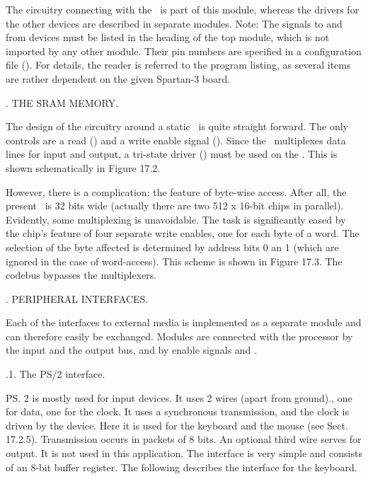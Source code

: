 {The circuitry connecting with the \SRAM\ is part of this module, whereas the drivers for the other devices are described in separate modules. Note: The signals to and from devices must be listed in the heading of the top module, which is not imported by any other module. Their pin numbers are specified in a configuration file (). For details, the reader is referred to the program listing, as several items are rather dependent on the given Spartan-3 board.

. THE SRAM MEMORY.

The design of the circuitry around a static \RAM\ is quite straight forward. The only controls are a read () and a write enable signal (). Since the \SRAM\ multiplexes data lines for input and output, a tri-state driver () must be used on the \FPGA. This is shown schematically in Figure 17.2.


However, there is a complication: the feature of byte-wise access. After all, the present \RAM\ is 32 bits wide (actually there are two 512 x 16-bit chips in parallel). Evidently, some multiplexing is unavoidable. The task is significantly eased by the chip's feature of four separate write enables, one for each byte of a word. The selection of the byte affected is determined by address bits 0 an 1 (which are ignored in the case of word-access). This scheme is shown in Figure 17.3. The codebus bypasses the multiplexers.


. PERIPHERAL INTERFACES.

Each of the interfaces to external media is implemented as a separate module and can therefore easily be exchanged. Modules are connected with the processor by the input and the output bus, and by enable signals  and .

.1. The PS/2 interface.

\ps2 is mostly used for input devices. It uses 2 wires (apart from ground)., one for data, one for the clock. It uses a synchronous transmission, and the clock is driven by the device. Here it is used for the keyboard and the mouse (see Sect. 17.2.5). Transmission occurs in packets of 8 bits. An optional third wire serves for output. It is not used in this application. The interface is very simple and consists of an 8-bit buffer register. The following describes the interface for the keyboard.

}
